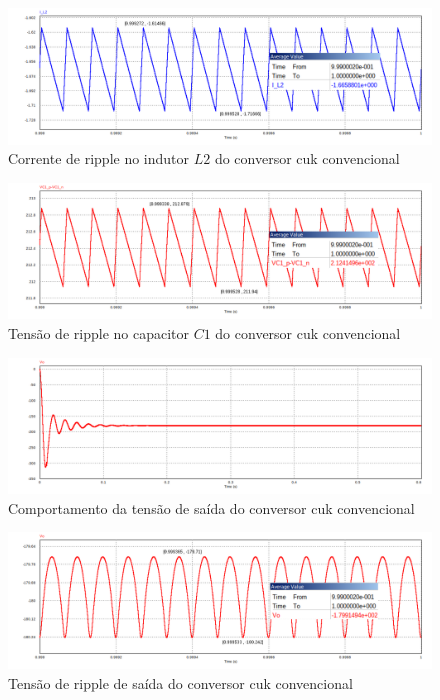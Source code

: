 \documentclass[
	12pt,				%
	openany,
	onseside,
	a4paper,			%
	english,			%
	french,				%
	spanish,			%
	brazil,				%
	]{abntex2}
\begin{document}
\begin{figure}[H]%
	\centering
		\includegraphics[width= \linewidth]{cuk_conv_ripp_I_L2}
		\caption{Corrente de ripple no indutor $L2$ do conversor cuk convencional}
		\label{fig:cuk_conv_ripp_I_L2}
\end{figure}

\begin{figure}[H]%
	\centering
		\includegraphics[width= \linewidth]{cuk_conv_ripp_V_C1}
		\caption{Tensão de ripple no capacitor $C1$ do conversor cuk convencional}
		\label{fig:cuk_conv_ripp_V_C1}
\end{figure}

\begin{figure}[H]%
	\centering
		\includegraphics[width= \linewidth]{cuk_conv_V_out}
		\caption{Comportamento da tensão de saída do conversor cuk convencional}
		\label{fig:cuk_conv_ripp_V_out}
\end{figure}

\begin{figure}[H]%
	\centering
		\includegraphics[width= \linewidth]{cuk_conv_ripp_V_out2}
		\caption{Tensão de ripple de saída do conversor cuk convencional}
		\label{fig:cuk_conv_ripp_V_out}
\end{figure}
\end{document}
